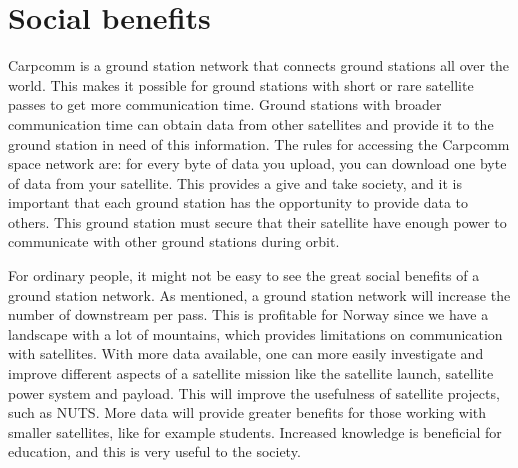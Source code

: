 \section{Social benefits}

Carpcomm is a ground station network that connects ground stations all over the world. This makes it possible for ground stations with short or rare satellite passes to get more communication time. Ground stations with broader communication time can obtain data from other satellites and provide it to the ground station in need of this information. The rules for accessing the Carpcomm space network are: for every byte of data you upload, you can download one byte of data from your satellite. This provides a give and take society, and it is important that each ground station has the opportunity to provide data to others. This ground station must secure that their satellite have enough power to communicate with other ground stations during orbit. 


For ordinary people, it might not be easy to see the great social benefits of a ground station network. As mentioned, a ground station network will increase the number of downstream per pass. This is profitable for Norway since we have a landscape with a lot of mountains, which provides limitations on communication with satellites. With more data available, one can more easily investigate and improve different aspects of a satellite mission like the satellite launch, satellite power system and payload. This will improve the usefulness of satellite projects, such as NUTS. More data will provide greater benefits for those working with smaller satellites, like for example students. Increased knowledge is beneficial for education, and this is very useful to the society.
